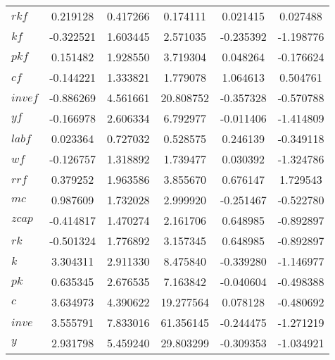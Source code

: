 \begin{center}
\begin{longtable}{lccccc}
$rkf       $	 & 	        0.219128	 & 	        0.417266	 & 	        0.174111	 & 	        0.021415	 & 	        0.027488 \\ 
$kf        $	 & 	       -0.322521	 & 	        1.603445	 & 	        2.571035	 & 	       -0.235392	 & 	       -1.198776 \\ 
$pkf       $	 & 	        0.151482	 & 	        1.928550	 & 	        3.719304	 & 	        0.048264	 & 	       -0.176624 \\ 
$cf        $	 & 	       -0.144221	 & 	        1.333821	 & 	        1.779078	 & 	        1.064613	 & 	        0.504761 \\ 
$invef     $	 & 	       -0.886269	 & 	        4.561661	 & 	       20.808752	 & 	       -0.357328	 & 	       -0.570788 \\ 
$yf        $	 & 	       -0.166978	 & 	        2.606334	 & 	        6.792977	 & 	       -0.011406	 & 	       -1.414809 \\ 
$labf      $	 & 	        0.023364	 & 	        0.727032	 & 	        0.528575	 & 	        0.246139	 & 	       -0.349118 \\ 
$wf        $	 & 	       -0.126757	 & 	        1.318892	 & 	        1.739477	 & 	        0.030392	 & 	       -1.324786 \\ 
$rrf       $	 & 	        0.379252	 & 	        1.963586	 & 	        3.855670	 & 	        0.676147	 & 	        1.729543 \\ 
$mc        $	 & 	        0.987609	 & 	        1.732028	 & 	        2.999920	 & 	       -0.251467	 & 	       -0.522780 \\ 
$zcap      $	 & 	       -0.414817	 & 	        1.470274	 & 	        2.161706	 & 	        0.648985	 & 	       -0.892897 \\ 
$rk        $	 & 	       -0.501324	 & 	        1.776892	 & 	        3.157345	 & 	        0.648985	 & 	       -0.892897 \\ 
$k         $	 & 	        3.304311	 & 	        2.911330	 & 	        8.475840	 & 	       -0.339280	 & 	       -1.146977 \\ 
$pk        $	 & 	        0.635345	 & 	        2.676535	 & 	        7.163842	 & 	       -0.040604	 & 	       -0.498388 \\ 
$c         $	 & 	        3.634973	 & 	        4.390622	 & 	       19.277564	 & 	        0.078128	 & 	       -0.480692 \\ 
$inve      $	 & 	        3.555791	 & 	        7.833016	 & 	       61.356145	 & 	       -0.244475	 & 	       -1.271219 \\ 
$y         $	 & 	        2.931798	 & 	        5.459240	 & 	       29.803299	 & 	       -0.309353	 & 	       -1.034921 \\ 

\end{longtable}
\end{center}

